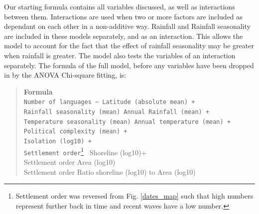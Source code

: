 \documentclass[a4paper,10pt]{article} %
\begin{document}

Our starting formula contains all variables discussed, as well as interactions between them. Interactions are used when two or more factors are included as dependant on each other in a non-additive way. Rainfall and Rainfall seasonality are included in these models separately, and as an interaction. This allows the model to account for the fact that the effect of rainfall seasonality may be greater when rainfall is greater. The model also tests the variables of an interaction separately. The formula of the full model, before any variables have been dropped in by the ANOVA Chi-square fitting, is:


\begin{quotation}
\textbf{Formula} \\
\texttt{Number of languages \textasciitilde{} Latitude (absolute mean) + \\
Rainfall seasonality (mean) \textasteriskcentered{}   Annual Rainfall (mean) + \\
Temperature seasonality (mean) \textasteriskcentered{}   Annual temperature (mean)  + \\
Political complexity (mean) + \\
Isolation (log10) + \\ 
Settlement order}\footnote{Settlement order was reversed from Fig. \ref{dates_map} such that high numbers represent further back in time and recent waves have a low number.}\texttt{\textasteriskcentered{} }  Shoreline (log10)+ \\
Settlement order \textasteriskcentered{}   Area (log10) \\ 
Settlement order \textasteriskcentered{}  Ratio shoreline (log10) to Area (log10) \\
\end{quotation}
\end{document}
